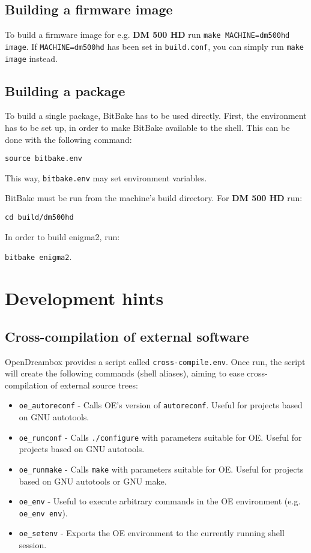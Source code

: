 \documentclass[a4paper]{article}
\newcommand{\shell}[1]{\texttt{\small #1}}
\begin{document}
  \subsection{Building a firmware image}
     To build a firmware image for e.g. \textbf{DM 500 HD} run \shell{make MACHINE=dm500hd image}.
     If \shell{MACHINE=dm500hd} has been set in \shell{build.conf}, you can simply run
     \shell{make image} instead.

  \subsection{Building a package}
     To build a single package, BitBake has to be used directly. First, the environment
     has to be set up, in order to make BitBake available to the shell. This can be done
     with the following command:

     \shell{source bitbake.env}

     This way, \shell{bitbake.env} may set environment variables.

     BitBake must be run from the machine's build directory. For \textbf{DM 500 HD} run:

     \shell{cd build/dm500hd}

     In order to build enigma2, run:

     \shell{bitbake enigma2}.

\section{Development hints}

  \subsection{Cross-compilation of external software}
    OpenDreambox provides a script called \shell{cross-compile.env}. Once run, the script will create
    the following commands (shell aliases), aiming to ease cross-compilation of external source trees:

    \begin{itemize}
      \item \shell{oe\_autoreconf} - Calls OE's version of \shell{autoreconf}. Useful for projects based on GNU autotools.
      \item \shell{oe\_runconf} - Calls \shell{./configure} with parameters suitable for OE. Useful for projects based on GNU autotools.
      \item \shell{oe\_runmake} - Calls \shell{make} with parameters suitable for OE. Useful for projects based on GNU autotools or GNU make.
      \item \shell{oe\_env} - Useful to execute arbitrary commands in the OE environment (e.g. \shell{oe\_env env}).
      \item \shell{oe\_setenv} - Exports the OE environment to the currently running shell session.
    \end{itemize}
\end{document}

